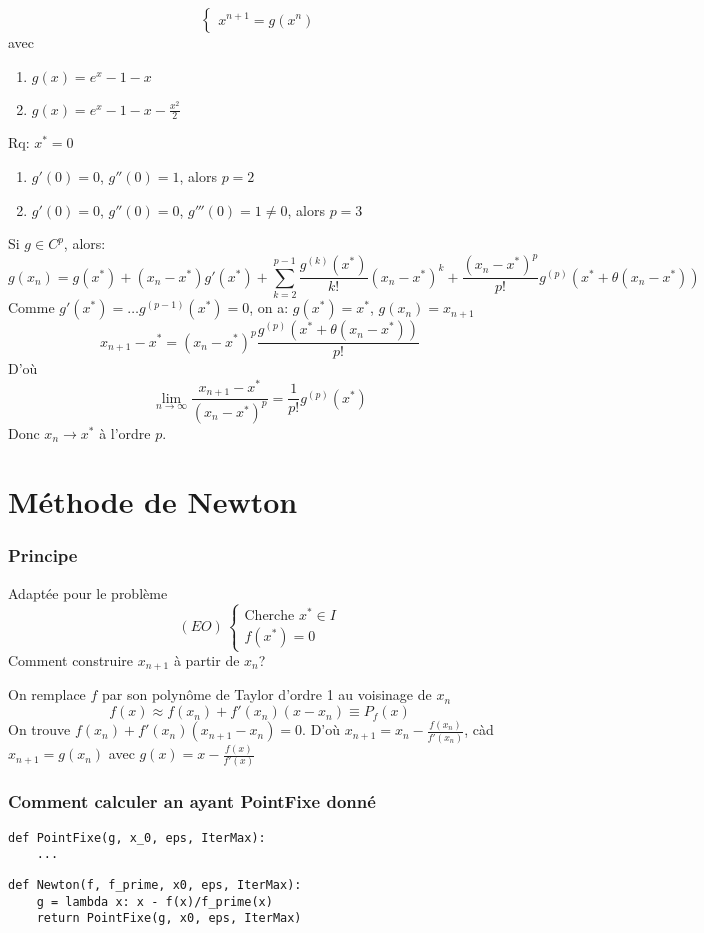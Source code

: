 \begin{eg}
    
\[
\begin{cases}
    x^{n+1} = g(x^n) 
\end{cases}
\] 
avec 
\begin{enumerate}
    \item $g(x) = e^x - 1 - x$
    \item  $g(x) = e^x - 1 - x - \frac{x^2}{2}$
\end{enumerate}
Rq: $x^* = 0$
 \begin{enumerate}
    \item $g'(0) = 0$,  $g''(0) = 1$, alors  $p=2$
    \item  $g'(0) = 0$,  $g''(0) = 0$,  $g'''(0) = 1 \neq 0$, alors $p = 3$
\end{enumerate}
\end{eg}

Si $g \in C^p$, alors:
\[
    g(x_n) = g(x^*) + (x_n - x^*)g'(x^*) + \sum_{k=2}^{p-1} \frac{g^{(k)}(x^*)}{k!}(x_n - x^*)^k + \frac{(x_n - x^*)^p}{p!}g^{(p)}(x^* + \theta(x_n - x^*))
\] 
Comme $g'(x^*) = \ldots g^{(p-1)}(x^*) = 0$, on a: $g(x^*) = x^*$,  $g(x_n) = x_{n+1}$
 \[
     x_{n+1} - x^* = (x_n - x^*)^p \frac{g^{(p)}(x^* + \theta(x_n - x^*))}{p!}
 \] 
 D'où
 \[
     \lim_{n \to \infty} \frac{x_{n+1} - x^*}{(x_n - x^*)^p} = \frac{1}{p!}g^{(p)}(x^*)
 \] 
 Donc $x_n \to x^*$ à l'ordre $p$.

 \section{Méthode de Newton}
 \subsubsection*{Principe}
 Adaptée pour le problème  
 \[
     (EO) \, \begin{cases}
         \text{Cherche } x^* \in I\\
         f(x^*) = 0
     \end{cases}
 \] 
 Comment construire $x_{n+1}$ à partir de $x_n$?
 \par
 On remplace  $f$ par son polynôme de Taylor d'ordre 1 au voisinage de  $x_n$
  \[
 f(x) \approx f(x_n) + f'(x_n)(x - x_n) \equiv P_f(x)
 \] 
 On trouve $f(x_n) + f'(x_n)(x_{n+1} - x_n) = 0$. D'où $x_{n+1} = x_n - \frac{f(x_n)}{f'(x_n)}$, càd $x_{n+1} = g(x_n)$ avec $g(x) = x - \frac{f(x)}{f'(x)}$ 

 \subsubsection*{Comment calculer an ayant PointFixe donné}
 \begin{lstlisting}
def PointFixe(g, x_0, eps, IterMax):
    ...
 \end{lstlisting}
 \begin{lstlisting}
def Newton(f, f_prime, x0, eps, IterMax):
    g = lambda x: x - f(x)/f_prime(x)
    return PointFixe(g, x0, eps, IterMax)
 \end{lstlisting}

